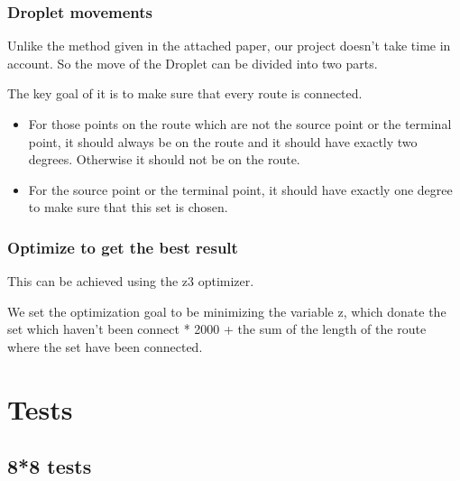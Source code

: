 \documentclass[12pt, a4paper]{article}
\begin{document}
				\subsubsection{Droplet movements}

					Unlike the method given in the attached paper, our project doesn't take time in account. So the move of the Droplet can be divided into two parts.

					The key goal of it is to make sure that every route is connected.  

					\begin{itemize}

						\item
							For those points on the route which are not the source point or the terminal point, it should always be on the route and it should have exactly two degrees. Otherwise it should not be on the route.
						\item
							For the source point or the terminal point, it should have exactly one degree to make sure that this set is chosen.

					\end{itemize}

				\subsubsection{Optimize to get the best result}

					This can be achieved using the z3 optimizer.

					We set the optimization goal to be minimizing the variable z, which donate the set which haven't been connect * 2000 + the sum of the length of the route where the set have been connected.
	\section{Tests}
		\subsection{8*8 tests}
	
\end{document}
